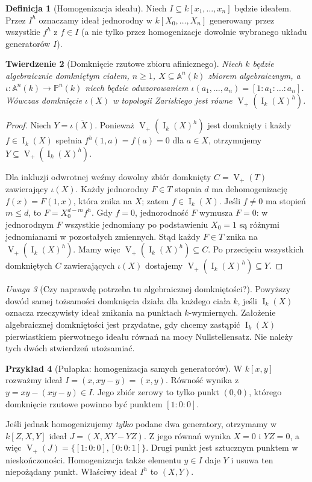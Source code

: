\documentclass[11pt,a4paper,openany]{report}
\numberwithin{equation}{section}
\theoremstyle{plain}
\newtheorem{twierdzenie}{Twierdzenie}[section]
\theoremstyle{definition}
\newtheorem{definicja}[twierdzenie]{Definicja}
\newtheorem{przyklad}[twierdzenie]{Przykład}
\theoremstyle{remark}
\newtheorem{uwaga}[twierdzenie]{Uwaga}
\newcommand{\A}{\mathbb A}
\newcommand{\PP}{\mathbb P}
\newcommand{\V}{\operatorname V}
\newcommand{\I}{\operatorname I}
\begin{document}
\begin{definicja}[Homogenizacja ideału]
Niech $I\subseteq k[x_1,\ldots,x_n]$ będzie ideałem.
Przez $I^h$ oznaczamy ideał jednorodny w
$k[X_0,\ldots,X_n]$ generowany przez wszystkie $f^h$
z $f\in I$ (a nie tylko przez homogenizacje dowolnie
wybranego układu generatorów $I$).
\end{definicja}

\begin{twierdzenie}[Domknięcie rzutowe zbioru afinicznego]
\label{tw:projective-closure}
Niech $k$ będzie algebraicznie domkniętym ciałem,
$n\ge1$, $X\subseteq\A^n(k)$ zbiorem algebraicznym,
a $\iota:\A^n(k)\to\PP^n(k)$ niech będzie odwzorowaniem
$\iota(a_1,\dots,a_n)=[1:a_1:\dots:a_n]$.
Wówczas domknięcie $\iota(X)$ w topologii Zariskiego jest równe
$\V_+(\I_k(X)^h)$.
\end{twierdzenie}
\begin{proof}
Niech $Y=\overline{\iota(X)}$.
Ponieważ $\V_+(\I_k(X)^h)$ jest domknięty i każdy
$f\in\I_k(X)$ spełnia $f^h(1,a)=f(a)=0$ dla $a\in X$,
otrzymujemy $Y\subseteq\V_+(\I_k(X)^h)$.

Dla inkluzji odwrotnej weźmy dowolny zbiór domknięty
$C=\V_+(T)$ zawierający $\iota(X)$.
Każdy jednorodny $F\in T$ stopnia $d$ ma dehomogenizację
$f(x)=F(1,x)$, która znika na $X$; zatem $f\in\I_k(X)$.
Jeśli $f\ne0$ ma stopień $m\le d$, to
$F=X_0^{d-m}f^h$. Gdy $f=0$, jednorodność $F$ wymusza
$F=0$: w jednorodnym $F$ wszystkie jednomiany po podstawieniu
$X_0=1$ są różnymi jednomianami w pozostałych zmiennych.
Stąd każdy $F\in T$ znika na $\V_+(\I_k(X)^h)$.
Mamy więc $\V_+(\I_k(X)^h)\subseteq C$.
Po przecięciu wszystkich domkniętych $C$ zawierających
$\iota(X)$ dostajemy $\V_+(\I_k(X)^h)\subseteq Y$.
\end{proof}

\begin{uwaga}[Czy naprawdę potrzeba tu algebraicznej domkniętości?]
Powyższy dowód samej tożsamości domknięcia działa dla
każdego ciała $k$, jeśli $\I_k(X)$ oznacza rzeczywisty
ideał znikania na punktach $k$-wymiernych. Założenie
algebraicznej domkniętości jest przydatne, gdy chcemy
zastąpić $\I_k(X)$ pierwiastkiem pierwotnego ideału równań
na mocy Nullstellensatz. Nie należy tych dwóch stwierdzeń
utożsamiać.
\end{uwaga}

\begin{przyklad}[Pułapka: homogenizacja samych generatorów]
W $k[x,y]$ rozważmy ideał
$I=(x,xy-y)=(x,y)$. Równość wynika z
$y=xy-(xy-y)\in I$. Jego zbiór zerowy to tylko punkt $(0,0)$,
którego domknięcie rzutowe powinno być punktem $[1:0:0]$.

Jeśli jednak homogenizujemy \emph{tylko} podane dwa generatory,
otrzymamy w $k[Z,X,Y]$ ideał
$J=(X,XY-YZ)$. Z jego równań wynika $X=0$ i $YZ=0$,
a więc $\V_+(J)=\{[1:0:0],[0:0:1]\}$.
Drugi punkt jest sztucznym punktem w nieskończoności.
Homogenizacja także elementu $y\in I$ daje $Y$ i usuwa
ten niepożądany punkt. Właściwy ideał $I^h$ to $(X,Y)$.
\end{przyklad}
\end{document}
